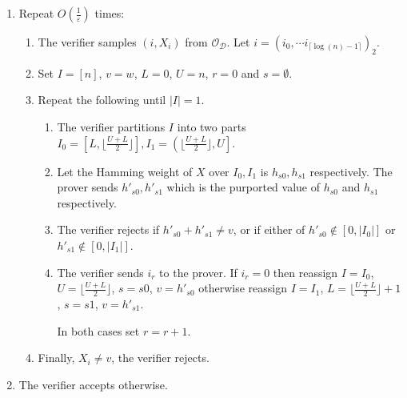 \documentclass[10pt,a4paper]{article}
\makeatletter
\newcommand{\HAM}{\mathsf{HAM}}
\newcommand{\sD}{\mathcal{D}}
\newcommand{\sO}{\mathcal{O}}
\newenvironment{protocol}[1][htb]{
    \renewcommand{\ALG@name}{Protocol}
    \begin{algorithm}[#1]
    }{\end{algorithm}
}
\makeatother
\begin{document}
\begin{protocol}
\caption{Interactive Proof of $\varepsilon$-proximity  for $\HAM(w)$}
\label{pcl:hamub}
\begin{enumerate}
    \item Repeat $O\left(\frac{1}{\varepsilon}\right)$ times:\label{erep}
\begin{enumerate}
    \item The verifier samples $(i,X_i)$ from $\sO_\sD$. Let $i=(i_{0}, \cdots i_{\lceil \log(n)-1\rceil})_{2}$.
    \item Set $I=[n]$, $v=w$, $L=0$, $U=n$, $r=0$ and $s= \emptyset$.
    \item Repeat the following until $\vert I\vert =1$. \label{binSplit}
    \begin{enumerate}
        \item The verifier partitions $I$ into two parts $I_{0}=\left[ L,\lfloor\frac{U+L}{2}\rfloor \right], I_{1}=\left(\lfloor\frac{U+L}{2}\rfloor , U\right]$.
        \item\label{hSent} Let the Hamming weight of $X$ over $I_{0}, I_{1}$ is $h_{s0}, h_{s1}$ respectively. The prover sends $h'_{s0},h'_{s1}$ which is the purported value of $h_{s0}$ and $h_{s1}$ respectively.
        \item \label{ConsCheck}The verifier rejects if $h'_{s0}+h'_{s1}\neq v$, or if either of $h'_{s0} \notin [0,\vert I_0 \vert]$ or $h'_{s1} \notin [0,\vert I_1 \vert]$.
        \item The verifier sends $i_{r}$ to the prover. If $i_{r}=0$ then reassign $I=I_{0}$, $U=\lfloor\frac{U+L}{2}\rfloor$,  $s=s0$, $v=h'_{s0}$ otherwise reassign $I=I_{1}$, $L=\lfloor\frac{U+L}{2}\rfloor+1$, $s=s1$, $v=h'_{s1}$. 
        
        In both cases set $r=r+1$.
    \end{enumerate}
    \item \label{samples} Finally, $X_{i}\neq v$, the verifier rejects.
\end{enumerate}
\item The verifier accepts otherwise.
\end{enumerate}
\end{protocol}
\end{document}
